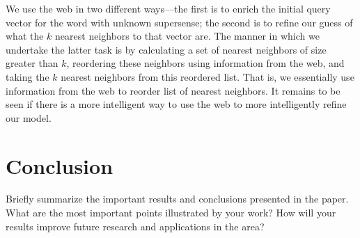 \documentclass{article}
\begin{document}
We use the web in two different ways---the first is to enrich the initial query vector for the word with unknown supersense; the second is to refine our guess of what the $k$ nearest neighbors to that vector are.
The manner in which we undertake the latter task is by calculating a set of nearest neighbors of size greater than $k$, reordering these neighbors using information from the web, and taking the $k$ nearest neighbors from this reordered list.
That is, we essentially use information from the web to reorder list of nearest neighbors.
It remains to be seen if there is a more intelligent way to use the web to more intelligently refine our model.

\section{Conclusion}

Briefly summarize the important results and conclusions presented in the paper. What are the most important points illustrated by your work? How will your results improve future research and applications in the area? 




{}

\end{document}
